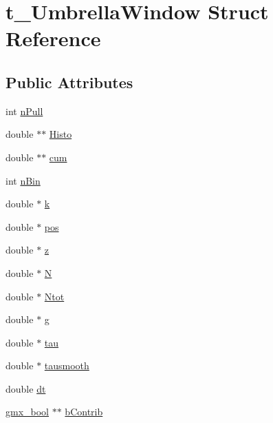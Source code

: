\hypertarget{structt__UmbrellaWindow}{\section{t\-\_\-\-Umbrella\-Window \-Struct \-Reference}
\label{structt__UmbrellaWindow}
}
\subsection*{\-Public \-Attributes}
\begin{DoxyCompactItemize}
\item 
int \hyperlink{structt__UmbrellaWindow_a751fbc90c7cd37ef8797e094234b3dc4}{n\-Pull}
\item 
double $\ast$$\ast$ \hyperlink{structt__UmbrellaWindow_afb187f878fd950e21a65d4f2dabd9f03}{\-Histo}
\item 
double $\ast$$\ast$ \hyperlink{structt__UmbrellaWindow_ac8f3a45335787704b85e3518c8b5a304}{cum}
\item 
int \hyperlink{structt__UmbrellaWindow_ae586edc60985737b83e6a390edc3246e}{n\-Bin}
\item 
double $\ast$ \hyperlink{structt__UmbrellaWindow_afc9d339843e24a9acc1cd07085fdc1dd}{k}
\item 
double $\ast$ \hyperlink{structt__UmbrellaWindow_ace1a860f95c6d3af285244aa15d3d172}{pos}
\item 
double $\ast$ \hyperlink{structt__UmbrellaWindow_a39fb82b3d8bed73ce85178d57c2d092f}{z}
\item 
double $\ast$ \hyperlink{structt__UmbrellaWindow_a6a39f74e39a2ca2ce9924d1601fd4a0c}{\-N}
\item 
double $\ast$ \hyperlink{structt__UmbrellaWindow_a049cdb9f306baee29927ac91c134940f}{\-Ntot}
\item 
double $\ast$ \hyperlink{structt__UmbrellaWindow_ad57409bfe43cf5c3fbf190e6a18ea597}{g}
\item 
double $\ast$ \hyperlink{structt__UmbrellaWindow_ad5c2e3731763f34178516238fc2ca74b}{tau}
\item 
double $\ast$ \hyperlink{structt__UmbrellaWindow_aadc18bb03dc382b3d7dfba51a455db56}{tausmooth}
\item 
double \hyperlink{structt__UmbrellaWindow_ac064764d5dbb0550e6b2e8567bb4de3b}{dt}
\item 
\hyperlink{include_2types_2simple_8h_a8fddad319f226e856400d190198d5151}{gmx\-\_\-bool} $\ast$$\ast$ \hyperlink{structt__UmbrellaWindow_a447d6ebc4f4c5519a9431abc95297675}{b\-Contrib}
$$
\end{DoxyCompactItemize}
